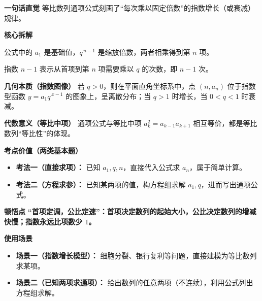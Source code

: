 \begin{explanationbox}
	\textbf{\textcolor{CExplanation}{一句话直觉}}
	等比数列通项公式刻画了“每次乘以固定倍数”的指数增长（或衰减）规律。

	\medskip
	\textbf{\textcolor{CExplanation}{核心拆解}}
	\begin{description}[style=nextline, leftmargin=2.8em, labelsep=0.5em, itemsep=0.45em]
		\item[\textbf{要点一（首项系数）：}]
			公式中的 $a_1$ 是基础值，$q^{\,n-1}$ 是缩放倍数，两者相乘得到第 $n$ 项。
		\item[\textbf{要点二（指数含义）：}]
			指数 $n-1$ 表示从首项到第 $n$ 项需要乘以 $q$ 的次数，即 $n-1$ 次。
	\end{description}

	\medskip
	\textbf{\textcolor{CExplanation}{几何本质（指数图像）}}
	若 $q>0$，则在平面直角坐标系中，点 $(n, a_n)$ 位于指数型函数 $y = a_1 q^{\,x-1}$ 的图象上，呈离散分布；当 $q>1$ 时增长，当 $0<q<1$ 时衰减。

	\medskip
	\textbf{\textcolor{CExplanation}{代数意义（等比中项）}}
	通项公式与等比中项 $a_{k}^2 = a_{k-1}a_{k+1}$ 相互等价，都是等比数列“等比性”的体现。

	\medskip
	\textbf{\textcolor{CExplanation}{考点价值（两类基本题）}}
	\begin{itemize}[leftmargin=*, itemsep=0.5em, topsep=0.4em]
		\item \textbf{考法一（直接求项）：} 已知 $a_1, q, n$，直接代入公式求 $a_n$，属于简单计算。
		\item \textbf{考法二（方程求参）：} 已知某两项的值，构方程组求解 $a_1, q$，进而写出通项公式。
	\end{itemize}

	\medskip
	\textbf{\textcolor{CExplanation}{顿悟点}}
	\textbf{“首项定调，公比定速”：首项决定数列的起始大小，公比决定数列的增减快慢；指数永远比项数少 $1$。}

	\medskip
	\textbf{\textcolor{CExplanation}{使用场景}}
	\begin{itemize}[leftmargin=*, itemsep=0.5em, topsep=0.4em]
		\item \textbf{场景一（指数增长模型）：} 细胞分裂、银行复利等问题，直接建模为等比数列求某项。
		\item \textbf{场景二（已知两项求通项）：} 给出数列的任意两项（不连续），利用公式列出方程组求解。
	\end{itemize}

\end{explanationbox}
